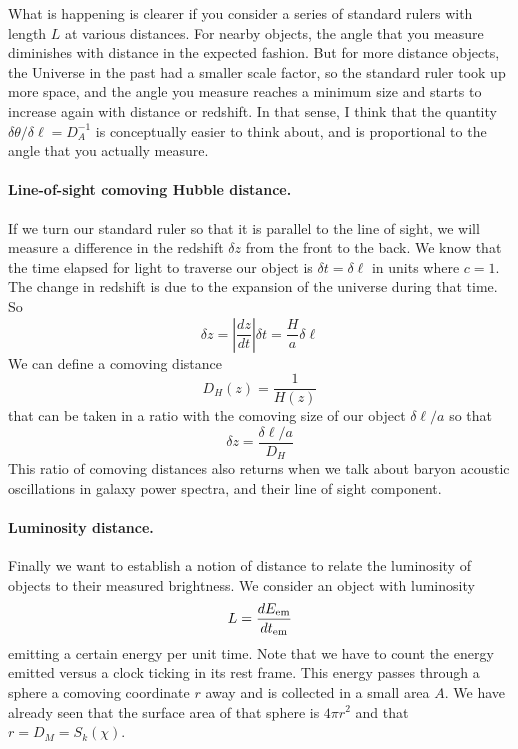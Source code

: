 What is happening is clearer if you consider a series of standard rulers with length $L$ at various distances.  For nearby objects, the angle that you measure diminishes with distance in the expected fashion.  But for more distance objects, the Universe in the past had a smaller scale factor, so the standard ruler took up more space, and the angle you measure reaches a minimum size and starts to increase again with distance or redshift.  In that sense, I think that the quantity $\delta\theta/\delta\ell = D_A^{-1}$ is conceptually easier to think about, and is proportional to the angle that you actually measure.


\paragraph{Line-of-sight comoving Hubble distance.}  If we turn our standard ruler so that it is parallel to the line of sight, we will measure a difference in the redshift $\delta z$ from the front to the back.  We know that the time elapsed for light to traverse our object is $\delta t = \delta\ell$ in units where $c=1$.  The change in redshift is due to the expansion of the universe during that time.
So
\begin{equation}
  \delta z = \left| \frac{dz}{dt} \right| \delta t = \frac{H}{a} \delta\ell
\end{equation}
We can define a comoving distance
\begin{equation}
  D_H(z) = \frac{1}{H(z)}
\end{equation}
that can be taken in a ratio with the comoving size of our object $\delta\ell/a$  so that
\begin{equation}
   \delta z = \frac{\delta\ell/a}{D_H}
\end{equation}
This ratio of comoving distances also returns when we talk about baryon acoustic oscillations in galaxy power spectra, and their line of sight component.

\paragraph{Luminosity distance.}  Finally we want to establish a notion of distance to relate the luminosity of objects to their measured brightness.  We consider an object with luminosity
\begin{equation}
  L = \frac{dE_{\rm em}}{dt_{\rm em}}
\end{equation}
emitting a certain energy per unit time.  Note that we have to count the energy emitted versus a clock ticking in its rest frame.  This energy passes through a sphere a comoving coordinate $r$ away and is collected in a small area $A$.  We have already seen that the surface area of that sphere is $4\pi r^2$ and that $r = D_M = S_k(\chi)$.

